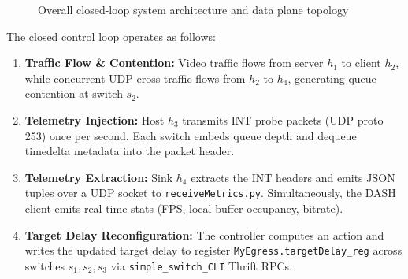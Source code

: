 \documentclass[12pt,a4paper,oneside]{report}
\begin{document}
\begin{figure}[H]
\caption{Overall closed-loop system architecture and data plane topology}
\label{fig:architecture}
\end{figure}

The closed control loop operates as follows:
\begin{enumerate}[label=\arabic*.]
  \item \textbf{Traffic Flow \& Contention:} Video traffic flows from server $h_1$ to client $h_2$, while concurrent UDP cross-traffic flows from $h_2$ to $h_4$, generating queue contention at switch $s_2$.
  \item \textbf{Telemetry Injection:} Host $h_3$ transmits INT probe packets (UDP proto 253) once per second. Each switch embeds queue depth and dequeue timedelta metadata into the packet header.
  \item \textbf{Telemetry Extraction:} Sink $h_4$ extracts the INT headers and emits JSON tuples over a UDP socket to \texttt{receiveMetrics.py}. Simultaneously, the DASH client emits real-time stats (FPS, local buffer occupancy, bitrate).
  \item \textbf{Target Delay Reconfiguration:} The controller computes an action and writes the updated target delay to register \texttt{MyEgress.targetDelay\_reg} across switches $s_1, s_2, s_3$ via \texttt{simple\_switch\_CLI} Thrift RPCs.
\end{enumerate}
\end{document}
